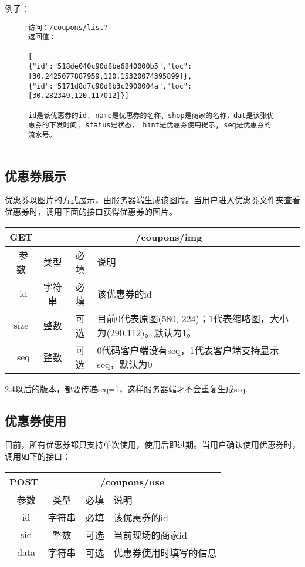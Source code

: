 例子：

\begin{figure}[H]
\begin{verbatim}
访问：/coupons/list?
返回值：

[
{"id":"518de040c90d8be6840000b5","loc":[30.2425077887959,120.15320074395899]},
{"id":"5171d8d7c90d8b3c2900004a","loc":[30.282349,120.117012]}]

id是该优惠券的id, name是优惠券的名称、shop是商家的名称，dat是该张优惠券的下发时间, status是状态， hint是优惠券使用提示, seq是优惠券的流水号。
 
\end{verbatim}
\end{figure}





 

\subsection{优惠券展示}
优惠券以图片的方式展示，由服务器端生成该图片。当用户进入优惠券文件夹查看优惠券时，调用下面的接口获得优惠券的图片。

\begin{table}[H]
   \begin{center}
\begin{tabular}{|c|c|c|p{12cm}|}
\hline
GET & \multicolumn{3}{|c|}{/coupons/img} \\
\hline\hline
 \  参数  & 类型 & 必填 &  说明  \\
\hline
 \  id  & 字符串 & 必填 &  该优惠券的id  \\
\hline
 size  & 整数 & 可选 &  目前0代表原图(580, 224)；1代表缩略图，大小为(290,112)。默认为1。\\ 
 \hline
 \  seq  & 整数 & 可选 &  0代码客户端没有seq，1代表客户端支持显示seq，默认为0 \\
\hline
\end{tabular}
   \end{center}
\end{table}
2.4以后的版本，都要传递seq=1，这样服务器端才不会重复生成seq.


\subsection{优惠券使用}
目前，所有优惠券都只支持单次使用，使用后即过期。当用户确认使用优惠券时，调用如下的接口：
\begin{table}[H]
   \begin{center}
\begin{tabular}{|c|c|c|p{12cm}|}
\hline
POST & \multicolumn{3}{|c|}{/coupons/use} \\
\hline\hline
 \  参数  & 类型 & 必填 &  说明  \\
\hline
 \  id  & 字符串 & 必填 &  该优惠券的id  \\
 \hline
 \ sid  &  整数 & 可选 & 当前现场的商家id\\  
 \hline
 \  data  & 字符串 & 可选 &  优惠券使用时填写的信息  \\
\hline
\end{tabular}
   \end{center}
\end{table}


